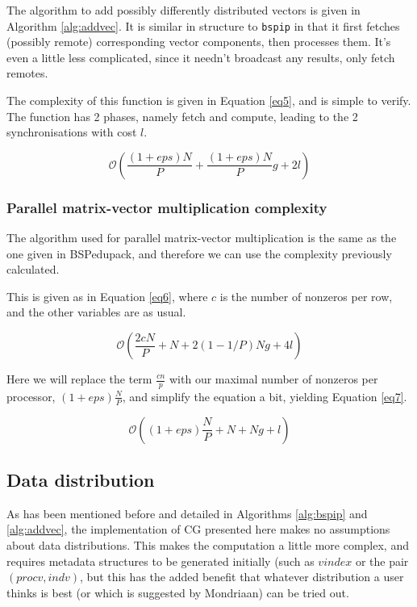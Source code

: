\documentclass[a4paper]{article}
\begin{document}
The algorithm to add possibly differently distributed vectors
is given in Algorithm \ref{alg:addvec}. It is similar in structure to
\texttt{bspip} in that it first fetches (possibly remote) corresponding
vector components, then processes them. It's even a little less complicated,
since it needn't broadcast any results, only fetch remotes.

The complexity of this function is given in Equation \ref{eq5}, and
is simple to verify. The function has 2 phases, namely fetch and compute, leading to the 2 synchronisations with cost $l$.

\begin{equation}
   \mathcal{O}\left( \frac{(1+eps)N}{P}  + \frac{(1+eps)N}{P} g + 2l\right)
    \label{eq5}
\end{equation}
\subsubsection{Parallel matrix-vector multiplication complexity}

The algorithm used for parallel matrix-vector multiplication is
the same as the one given in BSPedupack, and therefore we can
use the complexity previously calculated\cite{bisseling2004parallel}.

This is given as in Equation \ref{eq6}, where $c$ is the number of
nonzeros per row, and the other variables are as usual.

\begin{equation}
   \mathcal{O}\left(\frac{2cN}{P} + N + 2(1-1/P)Ng + 4l\right)
    \label{eq6}
\end{equation}

Here we will replace the term $\frac{cn}{p}$ with our maximal number of
nonzeros per processor, $(1+eps) \frac{N}{P}$, and simplify the equation
a bit, yielding Equation \ref{eq7}.

\begin{equation}
   \mathcal{O}\left( (1+eps)\frac{N}{P}  + N + Ng + l  \right)
    \label{eq7}
\end{equation}


\subsection{Data distribution}\label{sec:data-distribution}

As has been mentioned before and detailed in Algorithms \ref{alg:bspip} and \ref{alg:addvec}, the
implementation of CG presented here makes no assumptions about data distributions. This makes
the computation a little more complex, and requires metadata structures to be generated initially
(such as $vindex$ or the pair $(procv,indv)$, but this has the added benefit that whatever
distribution a user thinks is best (or which is suggested by Mondriaan) can be tried out.
\end{document}
